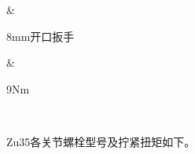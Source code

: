 \documentclass[a4paper,11pt,english,openany,oneside]{sphinxmanual}
\begin{document}
\begin{savenotes}
\begin{tabular}[t]{}
\begin{varwidth}[t]{}
\sphinxbeforeendvarwidth
\end{varwidth}%
&\begin{varwidth}[t]{}
\sphinxAtStartPar
8mm开口扳手
\sphinxbeforeendvarwidth
\end{varwidth}%
&\begin{varwidth}[t]{}
\sphinxAtStartPar
9Nm
\sphinxbeforeendvarwidth
\end{varwidth}%
\\
\sphinxbottomrule
\end{tabular}
\sphinxtableafterendhook\par
\sphinxattableend\end{savenotes}

\sphinxAtStartPar
Zu35各关节螺栓型号及拧紧扭矩如下。
\end{document}
